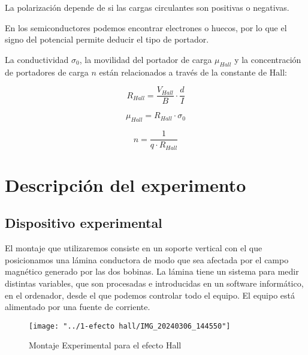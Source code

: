 \iffalse
\begin{equation}\label{eq:pythagoras}
a^2 + b^2 = c^2 .
\end{equation}


La ecuación \eqref{eq:pythagoras}. A ver cómo queda ¿podré referenciar sin necesidad de un label complejo?

\begin{equation} \label{1.2}
a^2 + b^2 = c^2 .
\end{equation}

Voy a intentar referenciar esta otra \eqref{1.2}
\fi



La polarización depende de si las cargas circulantes son positivas o negativas.

En los semiconductores podemos encontrar electrones o huecos, por lo que el signo del potencial permite deducir el tipo de portador. 

La conductividad $\sigma_0$, la movilidad del portador de carga $\mu_{Hall}$ y la concentración de portadores de carga $n$ están relacionados a través de la constante de Hall:

\[
R_{Hall} = \frac{V_{Hall}}{B} \cdot \frac{d}{I} 
\]


\[ 
\mu_{Hall} = R_{Hall}\cdot \sigma_0
\]

\[ 
n = \frac{1}{q\cdot R_{Hall}}
\]



\section{Descripción del experimento}

\subsection{Dispositivo experimental}

El montaje que utilizaremos consiste en un soporte vertical con el que posicionamos una lámina conductora de modo que sea afectada por el campo magnético generado por las dos bobinas. La lámina tiene un sistema para medir distintas variables, que son procesadas e introducidas en un software informático, en el ordenador, desde el que podemos controlar todo el equipo. El equipo está alimentado por una fuente de corriente.

\begin{figure}[H]
	\centering
	\texttt{[image: "../1-efecto hall/IMG\_20240306\_144550"]}
	\caption{Montaje Experimental para el efecto Hall}
	\label{fig:img20240306144550}
\end{figure}




